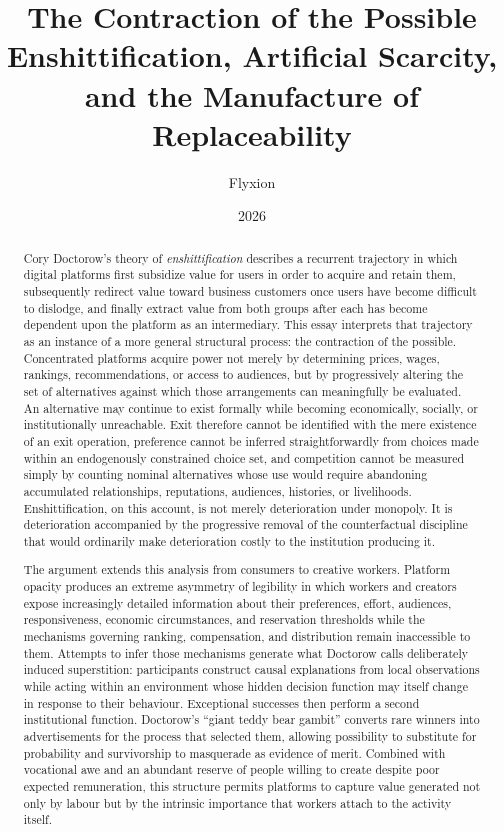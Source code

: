 \documentclass[11pt]{article}
\title{\textbf{The Contraction of the Possible}\\[0.5em]
\large Enshittification, Artificial Scarcity, and the Manufacture of Replaceability}
\author{Flyxion}
\date{2026}
\begin{document}
\maketitle

\begin{abstract}
Cory Doctorow's theory of \emph{enshittification} describes a recurrent trajectory in which digital platforms first subsidize value for users in order to acquire and retain them, subsequently redirect value toward business customers once users have become difficult to dislodge, and finally extract value from both groups after each has become dependent upon the platform as an intermediary. This essay interprets that trajectory as an instance of a more general structural process: the contraction of the possible. Concentrated platforms acquire power not merely by determining prices, wages, rankings, recommendations, or access to audiences, but by progressively altering the set of alternatives against which those arrangements can meaningfully be evaluated. An alternative may continue to exist formally while becoming economically, socially, or institutionally unreachable. Exit therefore cannot be identified with the mere existence of an exit operation, preference cannot be inferred straightforwardly from choices made within an endogenously constrained choice set, and competition cannot be measured simply by counting nominal alternatives whose use would require abandoning accumulated relationships, reputations, audiences, histories, or livelihoods. Enshittification, on this account, is not merely deterioration under monopoly. It is deterioration accompanied by the progressive removal of the counterfactual discipline that would ordinarily make deterioration costly to the institution producing it.

The argument extends this analysis from consumers to creative workers. Platform opacity produces an extreme asymmetry of legibility in which workers and creators expose increasingly detailed information about their preferences, effort, audiences, responsiveness, economic circumstances, and reservation thresholds while the mechanisms governing ranking, compensation, and distribution remain inaccessible to them. Attempts to infer those mechanisms generate what Doctorow calls deliberately induced superstition: participants construct causal explanations from local observations while acting within an environment whose hidden decision function may itself change in response to their behaviour. Exceptional successes then perform a second institutional function. Doctorow's ``giant teddy bear gambit'' converts rare winners into advertisements for the process that selected them, allowing possibility to substitute for probability and survivorship to masquerade as evidence of merit. Combined with vocational awe and an abundant reserve of people willing to create despite poor expected remuneration, this structure permits platforms to capture value generated not only by labour but by the intrinsic importance that workers attach to the activity itself.


\end{abstract}
\end{document}
